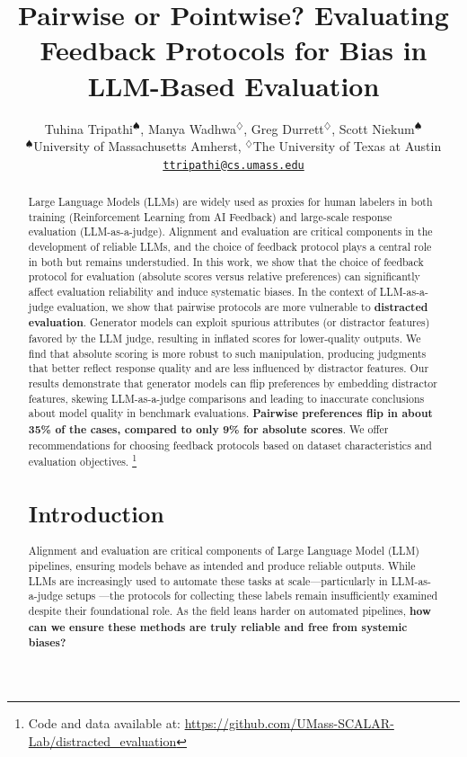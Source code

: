 \documentclass{article}
\title{Pairwise or Pointwise? Evaluating Feedback Protocols for Bias in LLM-Based Evaluation}
\author{Tuhina Tripathi$^{\spadesuit}$, Manya Wadhwa$^{\diamondsuit}$, Greg Durrett$^{\diamondsuit}$, Scott Niekum$^{\spadesuit}$ \\
$^{\spadesuit}$University of Massachusetts Amherst, $^{\diamondsuit}$The University of Texas at Austin \\
\texttt{\url{ttripathi@cs.umass.edu}}
}
\begin{document}
\ifcolmsubmission
\linenumbers
\fi

\maketitle

\begin{abstract}
Large Language Models (LLMs) are widely used as proxies for human labelers in both training (Reinforcement Learning from AI Feedback) and large-scale response evaluation (LLM-as-a-judge). Alignment and evaluation are critical components in the development of reliable LLMs, and the choice of feedback protocol plays a central role in both but remains understudied. In this work, we show that the choice of feedback protocol for evaluation (absolute scores versus relative preferences) can significantly affect evaluation reliability and induce systematic biases. In the context of LLM-as-a-judge evaluation, we show that pairwise protocols are more vulnerable to \textbf{distracted evaluation}. Generator models can exploit spurious attributes (or distractor features) favored by the LLM judge, resulting in inflated scores for lower-quality outputs. We find that absolute scoring is more robust to such manipulation, producing judgments that better reflect response quality and are less influenced by distractor features. Our results demonstrate that generator models can flip preferences by embedding distractor features, skewing LLM-as-a-judge comparisons and leading to inaccurate conclusions about model quality in benchmark evaluations. \textbf{Pairwise preferences flip in about 35\% of the cases, compared to only 9\% for absolute scores}. We offer recommendations for choosing feedback protocols based on dataset characteristics and evaluation objectives. \footnote{Code and data available at: \url{https://github.com/UMass-SCALAR-Lab/distracted_evaluation}}
\section{Introduction}

Alignment and evaluation are critical components of Large Language Model (LLM) pipelines, ensuring models behave as intended and produce reliable outputs. While LLMs are increasingly used to automate these tasks at scale---particularly in LLM-as-a-judge setups \citep{zheng2023judgingllmasajudgemtbenchchatbot, dubois2024alpacafarmsimulationframeworkmethods}---the protocols for collecting these labels remain insufficiently examined despite their foundational role. As the field leans harder on automated pipelines, \textbf{how can we ensure these methods are truly reliable and free from systemic biases?}


\end{abstract}
\end{document}

